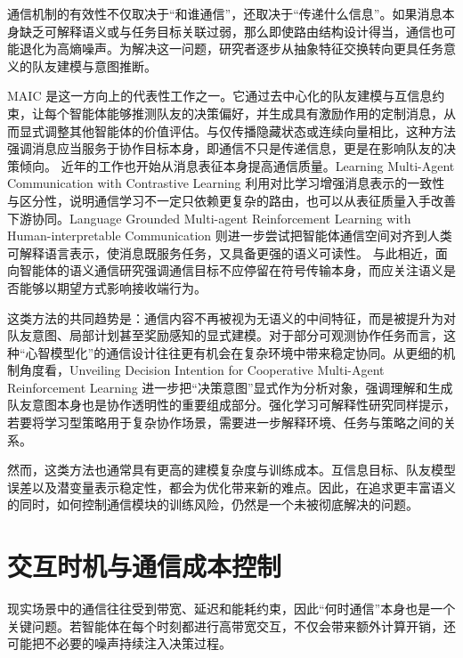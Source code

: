 通信机制的有效性不仅取决于“和谁通信”，还取决于“传递什么信息”。如果消息本身缺乏可解释语义或与任务目标关联过弱，那么即使路由结构设计得当，通信也可能退化为高熵噪声。为解决这一问题，研究者逐步从抽象特征交换转向更具任务意义的队友建模与意图推断。

MAIC 是这一方向上的代表性工作之一。它通过去中心化的队友建模与互信息约束，让每个智能体能够推测队友的决策偏好，并生成具有激励作用的定制消息，从而显式调整其他智能体的价值评估\cite{yuan2022maic}。与仅传播隐藏状态或连续向量相比，这种方法强调消息应当服务于协作目标本身，即通信不只是传递信息，更是在影响队友的决策倾向。
近年的工作也开始从消息表征本身提高通信质量。Learning Multi-Agent Communication with Contrastive Learning 利用对比学习增强消息表示的一致性与区分性，说明通信学习不一定只依赖更复杂的路由，也可以从表征质量入手改善下游协同\cite{lo2024learning}。Language Grounded Multi-agent Reinforcement Learning with Human-interpretable Communication 则进一步尝试把智能体通信空间对齐到人类可解释语言表示，使消息既服务任务，又具备更强的语义可读性\cite{li2024languagegroundedmarl}。
与此相近，面向智能体的语义通信研究强调通信目标不应停留在符号传输本身，而应关注语义是否能够以期望方式影响接收端行为\cite{zhang2022semanticcomm_cn}。

这类方法的共同趋势是：通信内容不再被视为无语义的中间特征，而是被提升为对队友意图、局部计划甚至奖励感知的显式建模。对于部分可观测协作任务而言，这种“心智模型化”的通信设计往往更有机会在复杂环境中带来稳定协同。从更细的机制角度看，Unveiling Decision Intention for Cooperative Multi-Agent Reinforcement Learning 进一步把“决策意图”显式作为分析对象，强调理解和生成队友意图本身也是协作透明性的重要组成部分\cite{zhang2025decisionintention}。强化学习可解释性研究同样提示，若要将学习型策略用于复杂协作场景，需要进一步解释环境、任务与策略之间的关系\cite{liu2023xrl_cn}。

然而，这类方法也通常具有更高的建模复杂度与训练成本。互信息目标、队友模型误差以及潜变量表示稳定性，都会为优化带来新的难点。因此，在追求更丰富语义的同时，如何控制通信模块的训练风险，仍然是一个未被彻底解决的问题。

\section{交互时机与通信成本控制}

现实场景中的通信往往受到带宽、延迟和能耗约束，因此“何时通信”本身也是一个关键问题。若智能体在每个时刻都进行高带宽交互，不仅会带来额外计算开销，还可能把不必要的噪声持续注入决策过程。

